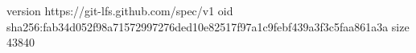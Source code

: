 version https://git-lfs.github.com/spec/v1
oid sha256:fab34d052f98a71572997276ded10e82517f97a1c9febf439a3f3c5faa861a3a
size 43840
